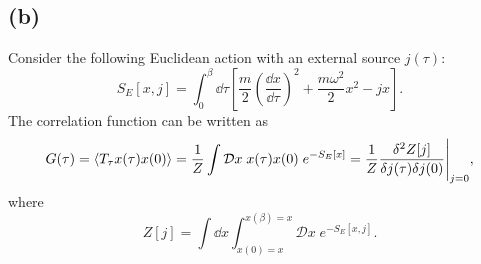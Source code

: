\documentclass{article}
\begin{document}
\subsection*{(b)}
Consider the following Euclidean action with an external source $j(\tau)$:
\begin{equation}
    S_E[x,j] = \int_0^{\beta} \dd{\tau} \left[ \frac{m}{2} \left( \frac{\dd{x}}{\dd{\tau}} \right)^2 + \frac{m\omega^2}{2} x^2 - jx \right].
\end{equation}
The correlation function can be written as
\begin{equation}
    G(\tau)=\expval{T_\tau x(\tau)x(0)}=\frac{1}{Z}\int \mathcal{D}x \; x(\tau)x(0) \; e^{-S_E[x]}=\frac{1}{Z}\frac{\delta^2 Z[j]}{\delta j(\tau)\delta j(0)}\Bigg|_{j=0},
\end{equation}
where
\begin{equation}
    Z[j] =\int\dd{x} \int_{x(0)=x}^{x(\beta)=x} \mathcal{D}x \; e^{-S_E[x,j]}.
\end{equation}
\end{document}
